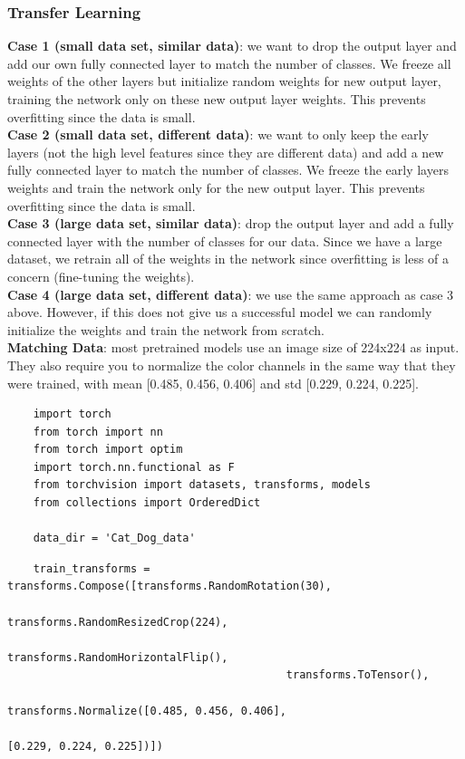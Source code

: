 \documentclass[11pt, a4paper]{article}
\begin{document}
\begin{spacing}{1.1}
	\subsubsection{Transfer Learning}
	\textbf{Case 1 (small data set, similar data)}: we want to drop the output layer and add our own fully connected layer to match the number of classes. We freeze all weights of the other layers but initialize random weights for new output layer, training the network only on these new output layer weights. This prevents overfitting since the data is small. \vspace*{2mm}\\
	\textbf{Case 2 (small data set, different data)}: we want to only keep the early layers (not the high level features since they are different data) and add a new fully connected layer to match the number of classes. We freeze the early layers weights and train the network only for the new output layer. This prevents overfitting since the data is small. \vspace*{2mm}\\
	\textbf{Case 3 (large data set, similar data)}: drop the output layer and add a fully connected layer with the number of classes for our data. Since we have a large dataset, we retrain all of the weights in the network since overfitting is less of a concern (fine-tuning the weights).\vspace*{2mm}\\
	\textbf{Case 4 (large data set, different data)}: we use the same approach as case 3 above. However, if this does not give us a successful model we can randomly initialize the weights and train the network from scratch. \vspace*{2mm}\\
	\textbf{Matching Data}: most pretrained models use an image size of 224x224 as input. They also require you to normalize the color channels in the same way that they were trained, with mean [0.485, 0.456, 0.406] and std [0.229, 0.224, 0.225].
	\begin{lstlisting}
	import torch
	from torch import nn
	from torch import optim
	import torch.nn.functional as F
	from torchvision import datasets, transforms, models
	from collections import OrderedDict
	
	data_dir = 'Cat_Dog_data' \end{lstlisting}\newpage

	\begin{lstlisting}
	train_transforms = transforms.Compose([transforms.RandomRotation(30),
	                                       transforms.RandomResizedCrop(224),
	                                       transforms.RandomHorizontalFlip(),
	                                       transforms.ToTensor(),
	                                       transforms.Normalize([0.485, 0.456, 0.406],
	                                                            [0.229, 0.224, 0.225])])
	

\end{lstlisting}
\end{spacing}
\end{document}
